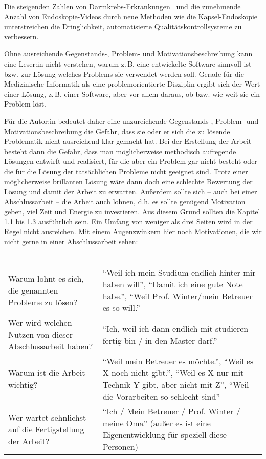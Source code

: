 Die steigenden Zahlen von Darmkrebs-Erkrankungen~\citep{acs-2024,ferlay-2024} und die zunehmende Anzahl von Endoskopie-Videos durch neue Methoden wie die Kapsel-Endoskopie~\citep{koulaouzidis-2021} unterstreichen die Dringlichkeit, automatisierte Qualitätskontrollsysteme zu verbessern.

Ohne ausreichende Gegenstands-, Problem- und Motivationsbeschreibung kann eine Leser:in nicht verstehen, warum z.\,B. eine entwickelte Software sinnvoll ist bzw. zur Lösung welches Problems sie verwendet werden soll.
Gerade für die Medizinische Informatik als eine problemorientierte Disziplin ergibt sich der Wert einer Lösung, z.\,B. einer Software, aber vor allem daraus, ob bzw. wie weit sie ein Problem löst.

Für die Autor:in bedeutet daher eine unzureichende Gegenstands-, Problem- und Motivationsbeschreibung die Gefahr, dass sie oder er sich die zu lösende Problematik nicht ausreichend klar gemacht hat.
Bei der Erstellung der Arbeit besteht dann die Gefahr, dass man möglicherweise methodisch aufregende Lösungen entwirft und realisiert, für die aber ein Problem gar nicht besteht oder die für die Lösung der tatsächlichen Probleme nicht geeignet sind.
Trotz einer möglicherweise brillanten Lösung wäre dann doch eine schlechte Bewertung der Lösung und damit der Arbeit zu erwarten.
Außerdem sollte sich -- auch bei einer Abschlussarbeit -- die Arbeit auch lohnen, d.h. es sollte genügend Motivation geben, viel Zeit und Energie zu investieren.
Aus diesem Grund sollten die Kapitel 1.1 bis 1.3 ausführlich sein.
Ein Umfang von weniger als drei Seiten wird in der Regel nicht ausreichen.
Mit einem Augenzwinkern hier noch Motivationen, die wir nicht gerne in einer Abschlussarbeit sehen:\\
~~\\

\begin{tabulary}{0.965\textwidth}{LL}
Warum lohnt es sich, die genannten Probleme zu lösen?						&\enquote{Weil ich mein Studium endlich hinter mir haben will}, \enquote{Damit ich eine gute Note habe.}, \enquote{Weil Prof. Winter/mein Betreuer es so will.}\\
Wer wird welchen Nutzen von dieser Abschlussarbeit haben?					&\enquote{Ich, weil ich dann endlich mit studieren fertig bin / in den Master darf.}\\
Warum ist die Arbeit wichtig?												&\enquote{Weil mein Betreuer es möchte.}, \enquote{Weil es X noch nicht gibt.}, \enquote{Weil es X nur mit Technik Y gibt, aber nicht mit Z}, \enquote{Weil die Vorarbeiten so schlecht sind}\\
Wer wartet sehnlichst auf die Fertigstellung der Arbeit?					&\enquote{Ich / Mein Betreuer / Prof. Winter / meine Oma} (außer es ist eine Eigenentwicklung für speziell diese Personen)\\
\end{tabulary}


